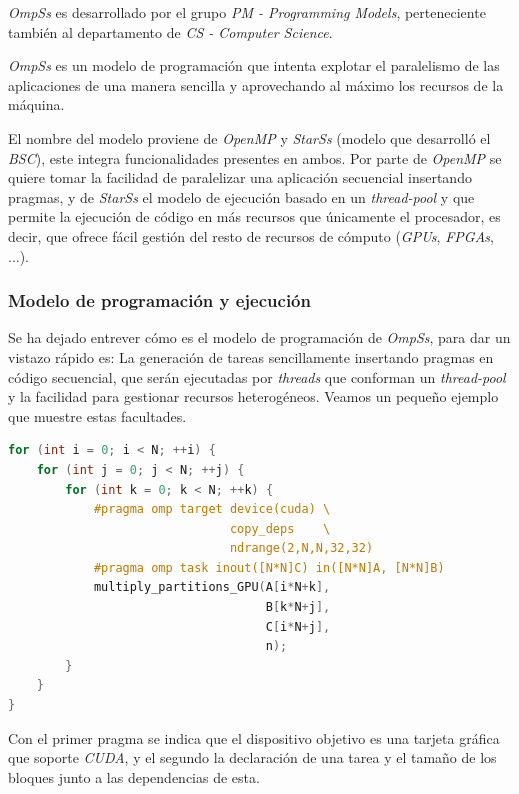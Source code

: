 \documentclass[a4paper]{article}
\begin{document}
\textit{OmpSs} es desarrollado por el grupo \textit{PM - Programming Models}, perteneciente también al departamento de \textit{CS - Computer Science}.
\par\bigskip

\textit{OmpSs} es un modelo de programación que intenta explotar el paralelismo de las aplicaciones de una manera sencilla y aprovechando al máximo los recursos de la máquina. 
\par\bigskip
El nombre del modelo proviene de \textit{OpenMP} y \textit{StarSs} (modelo que desarrolló el \textit{BSC}), este integra funcionalidades presentes en ambos. Por parte de \textit{OpenMP} se quiere tomar la facilidad de paralelizar una aplicación secuencial insertando pragmas, y de \textit{StarSs} el modelo de ejecución basado en un \textit{thread-pool} y que permite la ejecución de código en más recursos que únicamente el procesador, es decir, que ofrece fácil gestión del resto de recursos de cómputo (\textit{GPUs}, \textit{FPGAs}, ...).

\subsubsection{Modelo de programación y ejecución}

Se ha dejado entrever cómo es el modelo de programación de \textit{OmpSs}, para dar un vistazo rápido es: La generación de tareas sencillamente insertando pragmas en código secuencial, que serán ejecutadas por \textit{threads} que conforman un \textit{thread-pool} y la facilidad para gestionar recursos heterogéneos. Veamos un pequeño ejemplo que muestre estas facultades. 

\begin{lstlisting}[caption={Multiplicación de un bloque de una matriz utilizando GPUs.}, captionpos=b, label={lst:ejemplo-functions.cc}, language=C++]
for (int i = 0; i < N; ++i) {
    for (int j = 0; j < N; ++j) {
        for (int k = 0; k < N; ++k) {
            #pragma omp target device(cuda) \
                               copy_deps    \
                               ndrange(2,N,N,32,32)
            #pragma omp task inout([N*N]C) in([N*N]A, [N*N]B)
            multiply_partitions_GPU(A[i*N+k], 
                                    B[k*N+j], 
                                    C[i*N+j], 
                                    n);
        }
    }
}
\end{lstlisting}

Con el primer pragma se indica que el dispositivo objetivo es una tarjeta gráfica que soporte \textit{CUDA}, y el segundo la declaración de una tarea y el tamaño de los bloques junto a las dependencias de esta.
\par\bigskip
\end{document}
